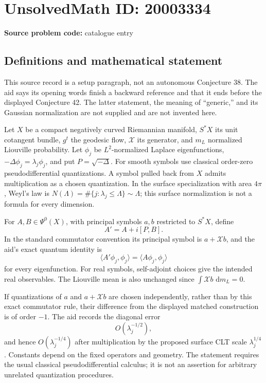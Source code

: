 \documentclass[11pt]{article}
\newcommand{\dd}{\,\mathrm{d}}
\begin{document}
\section*{UnsolvedMath ID: 20003334}
\textbf{Source problem code:} catalogue entry
\subsection{Definitions and mathematical statement}
This source record is a setup paragraph, not an autonomous Conjecture 38. The aid says its opening words finish a backward reference and that it ends before the displayed Conjecture 42. The latter statement, the meaning of ``generic,'' and its Gaussian normalization are not supplied and are not invented here.

Let \(X\) be a compact negatively curved Riemannian manifold, \(S^*X\) its unit cotangent bundle, \(g^t\) the geodesic flow, \(\mathcal X\) its generator, and \(m_L\) normalized Liouville probability. Let \(\phi_j\) be \(L^2\)-normalized Laplace eigenfunctions, \(-\Delta\phi_j=\lambda_j\phi_j\), and put \(P=\sqrt{-\Delta}\). For smooth symbols use classical order-zero pseudodifferential quantizations. A symbol pulled back from \(X\) admits multiplication as a chosen quantization. In the surface specialization with area \(4\pi\), Weyl's law is \(N(\Lambda)=\#\{j:\lambda_j\leq\Lambda\}\sim\Lambda\); this surface normalization is not a formula for every dimension.

For \(A,B\in\Psi^0(X)\), with principal symbols \(a,b\) restricted to \(S^*X\), define
\[
 A'=A+i[P,B].
\]
In the standard commutator convention its principal symbol is \(a+\mathcal Xb\), and the aid's exact quantum identity is
\[
 \langle A'\phi_j,\phi_j\rangle=\langle A\phi_j,\phi_j\rangle
\]
for every eigenfunction. For real symbols, self-adjoint choices give the intended real observables. The Liouville mean is also unchanged since \(\int\mathcal Xb\,\dd m_L=0\).

If quantizations of \(a\) and \(a+\mathcal Xb\) are chosen independently, rather than by this exact commutator rule, their difference from the displayed matched construction is of order \(-1\). The aid records the diagonal error
\[
 O(\lambda_j^{-1/2}),
\]
and hence \(O(\lambda_j^{-1/4})\) after multiplication by the proposed surface CLT scale \(\lambda_j^{1/4}\). Constants depend on the fixed operators and geometry. The statement requires the usual classical pseudodifferential calculus; it is not an assertion for arbitrary unrelated quantization procedures.
\end{document}
